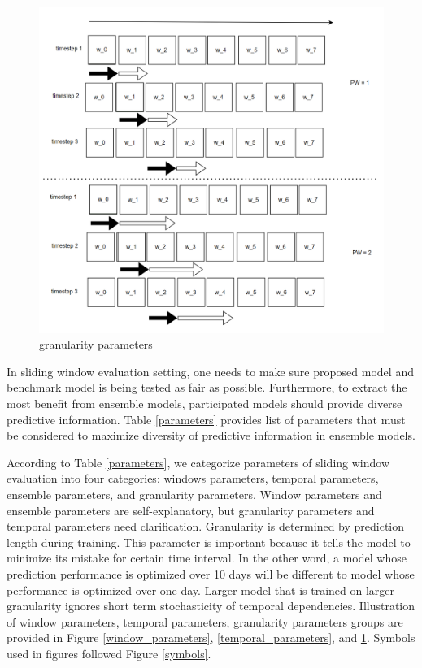 \documentclass{IEEEtran}
\begin{document}
\begin{figure}[htbp]
\centering
\includegraphics[width=.9\linewidth]{./images/screenshot_20220321_130720.png}
\caption{\label{granularity_parameters}granularity parameters}
\end{figure}


In sliding window evaluation setting, one needs to make sure proposed model and benchmark model is being tested as fair as possible. Furthermore, to extract the most benefit from ensemble models, participated models should provide diverse predictive information. Table \ref{parameters} provides list of parameters that must be considered to maximize diversity of predictive information in ensemble models.

According to Table \ref{parameters}, we categorize parameters of sliding window evaluation into four categories: windows parameters, temporal parameters, ensemble parameters, and granularity parameters.
Window parameters and ensemble parameters are self-explanatory, but granularity parameters and temporal parameters need clarification.
Granularity is determined by prediction length during training. This parameter is important because it tells the model to minimize its mistake for certain time interval. In the other word, a model whose prediction performance is optimized over 10 days will be different to model whose performance is optimized over one day. Larger model that is trained on larger granularity ignores short term stochasticity of temporal dependencies. Illustration of window parameters, temporal parameters, granularity parameters groups are provided in Figure \ref{window_parameters}, \ref{temporal_parameters}, and \ref{granularity_parameters}. Symbols used in figures followed Figure \ref{symbols}.
\end{document}
